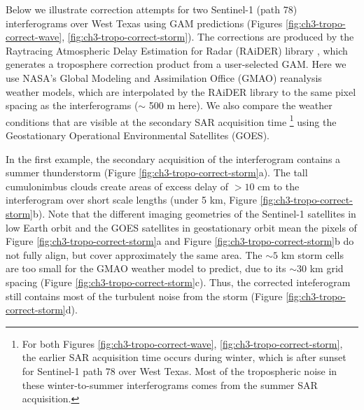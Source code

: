 Below we illustrate correction attempts for two Sentinel-1 (path 78) interferograms over West Texas using GAM predictions (Figures \ref{fig:ch3-tropo-correct-wave}, \ref{fig:ch3-tropo-correct-storm}). 
The corrections are produced by the Raytracing Atmospheric Delay Estimation for Radar (RAiDER) library \citep{Maurer2021RaiderRaytracingAtmospheric}, which generates a troposphere correction product from a user-selected GAM. Here we use NASA's Global Modeling and Assimilation Office (GMAO) reanalysis weather models, which are interpolated by the RAiDER library to the same pixel spacing as the interferograms ($\sim$ 500 m here). We also compare the weather conditions that are visible at the secondary SAR acquisition time \footnote{For both Figures \ref{fig:ch3-tropo-correct-wave}, \ref{fig:ch3-tropo-correct-storm}, the earlier SAR acquisition time occurs during winter, which is after sunset for Sentinel-1 path 78 over West Texas. Most of the tropospheric noise in these winter-to-summer interferograms comes from the summer SAR acquisition.} using the Geostationary Operational Environmental Satellites (GOES).

In the first example, the secondary acquisition of the interferogram contains a summer thunderstorm (Figure \ref{fig:ch3-tropo-correct-storm}a). The tall cumulonimbus clouds create areas of excess delay of $>10$ cm to the interferogram over short scale lengths (under 5 km, Figure \ref{fig:ch3-tropo-correct-storm}b). 
Note that the different imaging geometries of the Sentinel-1 satellites in low Earth orbit and the GOES satellites in geostationary orbit mean the pixels of Figure \ref{fig:ch3-tropo-correct-storm}a and Figure \ref{fig:ch3-tropo-correct-storm}b do not fully align, but cover approximately the same area.
The $\sim 5$ km storm cells are too small for the GMAO weather model to predict, due to its $\sim30$ km grid spacing (Figure \ref{fig:ch3-tropo-correct-storm}c). Thus, the corrected inteferogram still contains most of the turbulent noise from the storm (Figure \ref{fig:ch3-tropo-correct-storm}d).

